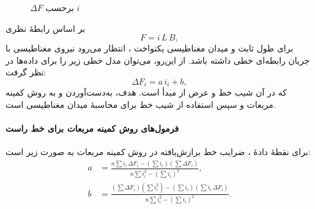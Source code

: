 \documentclass[a4paper, 11pt]{article}
\begin{document}
\begin{figure}[h]
\caption{{$\Delta F$ برحسب $i$}}
\label{fig:iF}
\centering
{}

\end{figure}



 بر اساس رابطهٔ نظری
\begin{equation}
F = i\,L\,B,
\end{equation}
برای طول ثابت  و میدان مغناطیسی یکنواخت ، انتظار می‌رود نیروی مغناطیسی با جریان  رابطه‌ای خطی داشته باشد. از این‌رو، می‌توان مدل خطی زیر را برای داده‌ها در نظر گرفت:
\begin{equation}
\Delta F_i = a\,i_i + b,
\end{equation}
که در آن  شیب خط و  عرض از مبدأ است. هدف، به‌دست‌آوردن  و  به روش کمینه مربعات و سپس استفاده از شیب خط برای محاسبهٔ میدان مغناطیسی  است.

\paragraph{فرمول‌های روش کمینه مربعات برای خط راست}
برای  نقطهٔ دادهٔ ، ضرایب خط برازش‌یافته  در روش کمینه مربعات به صورت زیر است:
\begin{align}
a &= \frac{n\sum i_i\,\Delta F_i - \left(\sum i_i\right)\left(\sum \Delta F_i\right)}
         {n\sum i_i^2 - \left(\sum i_i\right)^2}, \\
b &= \frac{\left(\sum \Delta F_i\right)\left(\sum i_i^2\right) - \left(\sum i_i\right)\left(\sum i_i\,\Delta F_i\right)}
         {n\sum i_i^2 - \left(\sum i_i\right)^2}.
\end{align}
\end{document}
